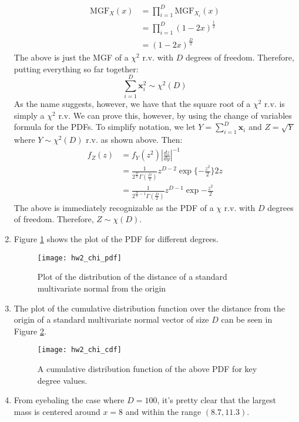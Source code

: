 \documentclass[submit]{harvardml}
\newcommand{\bx}{\mathbf{x}}
\begin{document}
\begin{enumerate}
\begin{align*}
\text{MGF}_X(x) &= \prod_{i=1}^{D} \text{MGF}_{X_i}(x) \tag{i.i.d} \\
&= \prod_{i=1}^D (1-2x)^{\frac{1}{2}} \\
&= (1-2x)^{\frac{D}{2}}
\end{align*}
The above is just the MGF of a $\chi^2$ r.v. with $D$ degrees of freedom. Therefore, putting everything so far together:
$$
\sum_{i=1}^{D}{\bx_i^2} \sim \chi^2(D)
$$
As the name suggests, however, we have that the square root of a $\chi^2$ r.v. is simply a $\chi^2$ r.v. We can prove this, however, by using the change of variables formula for the PDFs. To simplify notation, we let $Y = \sum_{i=1}^{D} \bx_i$ and $Z = \sqrt{Y}$ where $Y \sim \chi^2(D)$ r.v. as shown above. Then:
\begin{align*}
f_Z(z) &= f_Y(z^2) |\frac{dz}{dy}|^{-1} \\
&= \frac{1}{2^{\frac{D}{2}}\Gamma(\frac{D}{2})} z^{D - 2} \exp \{-\frac{z^2}{2} \} 2z \\
&= \frac{1}{2^{\frac{D}{2} - 1}\Gamma(\frac{D}{2})}z^{D-1}\exp{-\frac{z^2}{2}}
\end{align*}
The above is immediately recognizable as the PDF of a $\chi$ r.v. with $D$ degrees of freedom. Therefore, $Z \sim \chi(D)$.
\item Figure \ref{fig:chi_pdf} shows the plot of the PDF for different degrees.
\begin{figure}[!h]
\centering
\texttt{[image: hw2\_chi\_pdf]}
\caption{Plot of the distribution of the distance of a standard multivariate normal from the origin}
\label{fig:chi_pdf}
\end{figure}
\item The plot of the cumulative distribution function over the distance from the origin of a standard multivariate normal vector of size $D$ can be seen in Figure \ref{fig:chi_cdf}.
\begin{figure}[!h]
\centering
\texttt{[image: hw2\_chi\_cdf]}
\caption{A cumulative distribution function of the above PDF for key degree values.}
\label{fig:chi_cdf}
\end{figure}

\item From eyebaling the case where $D = 100$, it's pretty clear that the largest mass is centered around $x = 8$ and within the range $(8.7, 11.3)$.

\end{enumerate}
\end{document}
